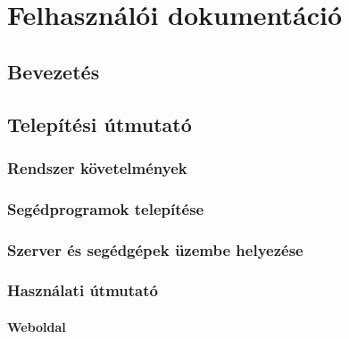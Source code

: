 \documentclass{elteikthesis}
\begin{document}
\chapter{Felhasználói dokumentáció}
\begin{comment}
A Felhasználói dokumentáció tartalmazza
- a megoldott probléma rövid megfogalmazását,
- a felhasznált módszerek rövid leírását,
- a program használatához szükséges összes információt

Magába foglalja a telepítési- (vagy üzemeltetési-) és a végfelhasználói leírást. Ezek
meghatározott célközönséghez szólnak, könnyen és gyorsan kell, hogy eligazítsák a
felhasználót a program használatában!

\end{comment}
\section{Bevezetés}
\section{Telepítési útmutató}
\subsection{Rendszer követelmények}
\subsection{Segédprogramok telepítése}
\subsection{Szerver és segédgépek üzembe helyezése}
\subsection{Használati útmutató}
\subsubsection{Weboldal}
\end{document}
